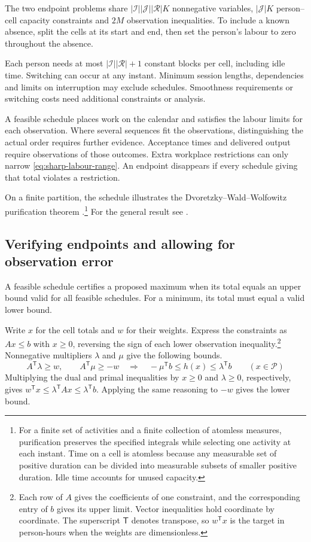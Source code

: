 The two endpoint problems share $|\mathcal I||\mathcal J||\mathcal R|K$ nonnegative variables, $|\mathcal J|K$ person--cell capacity constraints and $2M$ observation inequalities. To include a known absence, split the cells at its start and end, then set the person's labour to zero throughout the absence.

Each person needs at most $|\mathcal I||\mathcal R|+1$ constant blocks per cell, including idle time. Switching can occur at any instant. Minimum session lengths, dependencies and limits on interruption may exclude schedules. Smoothness requirements or switching costs need additional constraints or analysis.

A feasible schedule places work on the calendar and satisfies the labour limits for each observation. Where several sequences fit the observations, distinguishing the actual order requires further evidence. Acceptance times and delivered output require observations of those outcomes. Extra workplace restrictions can only narrow \eqref{eq:sharp-labour-range}. An endpoint disappears if every schedule giving that total violates a restriction.

On a finite partition, the schedule illustrates the Dvoretzky--Wald--Wolfowitz purification theorem \cite[Theorem~4]{dvoretzky1951ranges}.\footnote{For a finite set of activities and a finite collection of atomless measures, purification preserves the specified integrals while selecting one activity at each instant. Time on a cell is atomless because any measurable set of positive duration can be divided into measurable subsets of smaller positive duration. Idle time accounts for unused capacity.} For the general result see \cite[Section~2]{khanrathsun2006}.

\subsection{Verifying endpoints and allowing for observation error}

A feasible schedule certifies a proposed maximum when its total equals an upper bound valid for all feasible schedules. For a minimum, its total must equal a valid lower bound.

Write $x$ for the cell totals and $w$ for their weights. Express the constraints as $Ax\leq b$ with $x\geq0$, reversing the sign of each lower observation inequality.\footnote{Each row of $A$ gives the coefficients of one constraint, and the corresponding entry of $b$ gives its upper limit. Vector inequalities hold coordinate by coordinate. The superscript $\mathsf T$ denotes transpose, so $w^\mathsf{T}x$ is the target in person-hours when the weights are dimensionless.} Nonnegative multipliers $\lambda$ and $\mu$ give the following bounds.
\begin{equation}
\label{eq:bound-certificates}
 A^\mathsf{T}\lambda\geq w,\qquad
 A^\mathsf{T}\mu\geq-w
 \quad\Longrightarrow\quad
 -\mu^\mathsf{T}b\leq h(x)\leq\lambda^\mathsf{T}b
 \qquad(x\in\mathcal P)
\end{equation}
Multiplying the dual and primal inequalities by $x\geq0$ and $\lambda\geq0$, respectively, gives $w^\mathsf{T}x\leq\lambda^\mathsf{T}Ax\leq\lambda^\mathsf{T}b$. Applying the same reasoning to $-w$ gives the lower bound.

